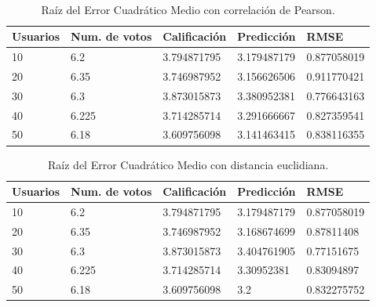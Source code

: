 \documentclass[12pt,letterpaper,oneside] {memoir}
\begin{document}
\paragraph*{}
\begin{table}[H]
	\caption{Raíz del Error Cuadrático Medio con correlación de Pearson.} \begin{center}
\linespread{0.9}\selectfont
\begin{tabular}{>{\footnotesize}p{1.0in}>{\footnotesize}p{1.0in}>{\footnotesize}p{1.0in}>{\footnotesize}p{1.0in}>{\footnotesize}p{1.0in}}
\hline                    
Usuarios & Num. de votos & Calificación & Predicción & RMSE\\
\hline             
10 & 6.2 & 3.794871795 & 3.179487179 & 0.877058019\\
20 & 6.35 & 3.746987952 & 3.156626506 & 0.911770421\\
30 & 6.3 & 3.873015873 & 3.380952381 & 0.776643163\\
40 & 6.225 & 3.714285714 & 3.291666667 & 0.827359541\\
50 & 6.18 & 3.609756098 & 3.141463415 & 0.838116355\\
\hline
\end{tabular}
\label{tab:RmsdPearson}
\end{center}
\end{table}


\begin{table}[H]
	\caption{Raíz del Error Cuadrático Medio con distancia euclidiana.} \begin{center}
\linespread{0.9}\selectfont
\begin{tabular}{>{\footnotesize}p{1.0in}>{\footnotesize}p{1.0in}>{\footnotesize}p{1.03in}>{\footnotesize}p{1.0in}>{\footnotesize}p{1.0in}}
\hline                    
Usuarios & Num. de votos & Calificación & Predicción & RMSE\\
\hline             
10 & 6.2 & 3.794871795 & 3.179487179 & 0.877058019\\
20 & 6.35 & 3.746987952 & 3.168674699 & 0.87811408\\
30 & 6.3 & 3.873015873 & 3.404761905 & 0.77151675\\
40 & 6.225 & 3.714285714 & 3.30952381 & 0.83094897\\
50 & 6.18 & 3.609756098 & 3.2 & 0.832275752\\
\hline
\end{tabular}
\label{tab:RmsdEuclidiana}
\end{center}
\end{table}
\end{document}
